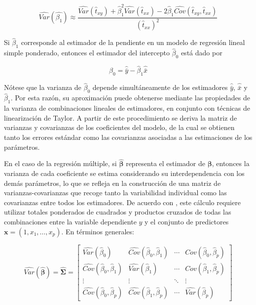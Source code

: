 \documentclass[
  spanish,
  12pt,
]{book}
\begin{document}
\[
\widehat{Var}\left(\hat{\beta_{1}}\right)
\approx  \frac{\widehat{Var}(\hat{t}_{xy})+\hat{\beta}_{1}^{2}\widehat{Var}(\hat{t}_{xx})-2\hat{\beta}_{1}\widehat{Cov}(\hat{t}_{xy},\hat{t}_{xx})}{(\hat{t}_{xx})^{2}}
\]

Si \(\hat{\beta}_{1}\) corresponde al estimador de la pendiente en un modelo de regresión lineal simple ponderado, entonces el estimador del intercepto \(\hat{\beta}_{0}\) está dado por

\[
\hat{\beta}_{0} = \hat{\bar{y}} - \hat{\beta}_{1}\hat{\bar{x}}
\]

Nótese que la varianza de \(\hat{\beta}_{0}\) depende simultáneamente de los estimadores \(\hat{\bar{y}}\), \(\hat{\bar{x}}\) y \(\hat{\beta}_{1}\). Por esta razón, su aproximación puede obtenerse mediante las propiedades de la varianza de combinaciones lineales de estimadores, en conjunto con técnicas de linearización de Taylor. A partir de este procedimiento se deriva la matriz de varianzas y covarianzas de los coeficientes del modelo, de la cual se obtienen tanto los errores estándar como las covarianzas asociadas a las estimaciones de los parámetros.

En el caso de la regresión múltiple, si \(\hat{\boldsymbol{\beta}}\) representa el estimador de \(\boldsymbol{\beta}\), entonces la varianza de cada coeficiente se estima considerando su interdependencia con los demás parámetros, lo que se refleja en la construcción de una matriz de varianzas-covarianzas que recoge tanto la variabilidad individual como las covarianzas entre todos los estimadores. De acuerdo con \citet{kish1974inference}, este cálculo requiere utilizar totales ponderados de cuadrados y productos cruzados de todas las combinaciones entre la variable dependiente \(y\) y el conjunto de predictores \(\mathbf{x} = (1, x_1, \ldots, x_p)\). En términos generales:

\[
\widehat{Var}(\hat{\boldsymbol{\beta}}) = \hat{\boldsymbol\Sigma} =
\begin{bmatrix}
\widehat{Var}(\hat{\beta}_{0}) & \widehat{Cov}(\hat{\beta}_{0},\hat{\beta}_{1}) & \cdots & \widehat{Cov}(\hat{\beta}_{0},\hat{\beta}_{p}) \\
\widehat{Cov}(\hat{\beta}_{0},\hat{\beta}_{1}) & \widehat{Var}(\hat{\beta}_{1}) & \cdots & \widehat{Cov}(\hat{\beta}_{1},\hat{\beta}_{p}) \\
\vdots & \vdots & \ddots & \vdots \\
\widehat{Cov}(\hat{\beta}_{0},\hat{\beta}_{p}) & \widehat{Cov}(\hat{\beta}_{1},\hat{\beta}_{p}) & \cdots & \widehat{Var}(\hat{\beta}_{p})
\end{bmatrix}
\]
\end{document}
